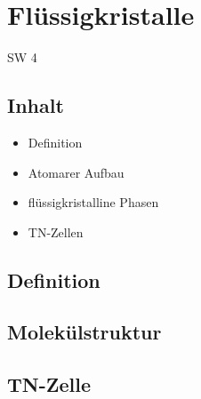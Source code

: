 \section{Flüssigkristalle}{SW 4}

\subsection{Inhalt}
\begin{itemize}
\item Definition
\item  Atomarer Aufbau
\item flüssigkristalline Phasen
\item TN-Zellen
\end{itemize}

\subsection{Definition}

\subsection{Molekülstruktur}

\subsection{TN-Zelle}
